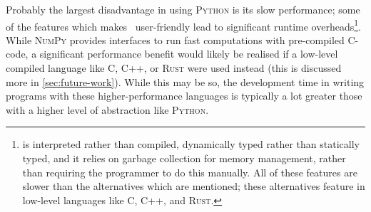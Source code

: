 Probably the largest disadvantage in using \textsc{Python} is its slow performance;
some of the features which makes \Python\ user-friendly lead to significant
runtime overheads\footnote{
    \Python is interpreted rather than compiled, dynamically typed rather
    than statically typed, and it relies on garbage collection for memory
    management, rather than requiring the programmer to do this manually. All
    of these features are slower than the alternatives which are mentioned;
    these alternatives feature in low-level languages like C, C++, and
    \textsc{Rust}.
}. While \textsc{NumPy} provides
interfaces to run fast computations with pre-compiled C-code, a significant
performance benefit would likely be realised if a low-level compiled language
like C, C++, or \textsc{Rust} were used instead (this is discussed more in
\cref{sec:future-work}). While this may be so, the
development time in writing programs with these higher-performance languages is
typically a lot greater those with a higher level of abstraction
like \textsc{Python}.

